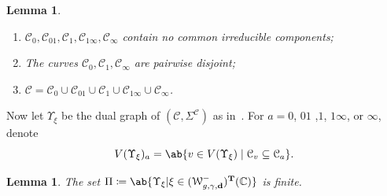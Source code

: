 \documentclass{amsart}
\newtheorem{lem}[thm]{Lemma}
\theoremstyle{definition}
\theoremstyle{remark}
\theoremstyle{plain}
\theoremstyle{definition}
\theoremstyle{remark}
\newcommand{\C}{\mathbb{C}}
\newcommand{\T}{\mathbf{T}}
\newcommand{\mc}[1]{\mathcal{#1}}
\newcommand{\mbf}[1]{\mathbf{#1}}
\newcommand{\1}{\mathbf{1}}
\newcommand{\2}{\mathbf{2}}
\newcommand{\3}{\mathbf{3}}
\begin{document}
\begin{lem}\leavevmode
    \begin{enumerate}
        \item $\mc{C}_0, \mc{C}_{01}, \mc{C}_1, \mc{C}_{1\infty}, \mc{C}_{\infty}$ contain no common irreducible components;
        \item The curves $\mc{C}_0, \mc{C}_1, \mc{C}_{\infty}$ are pairwise disjoint;
        \item $\mc{C} = \mc{C}_0 \cup \mc{C}_{01} \cup \mc{C}_1 \cup \mc{C}_{1\infty} \cup \mc{C}_{\infty}$.
    \end{enumerate}
\end{lem}


Now let $\Upsilon_{\xi}$ be the dual graph of $(\mc{C}, \Sigma^{\mc{C}})$ as in~\cite[\S 4.2]{mspfermat}. For $a = 0$, $01$ ,$1$, $1\infty$, or $\infty$, denote 
\[ V(\Upsilon_{\xi})_a = \ab\{v \in V(\Upsilon_{\xi}) \mid \mc{C}_v \subseteq \mc{C}_a\}. \]

\begin{lem}
    The set $\Pi \coloneqq \ab\{\Upsilon_{\xi} | \xi \in (\mc{W}^-_{g,\gamma,\mbf{d}})^{\T}(\C)\}$ is finite.
\end{lem}
\end{document}
